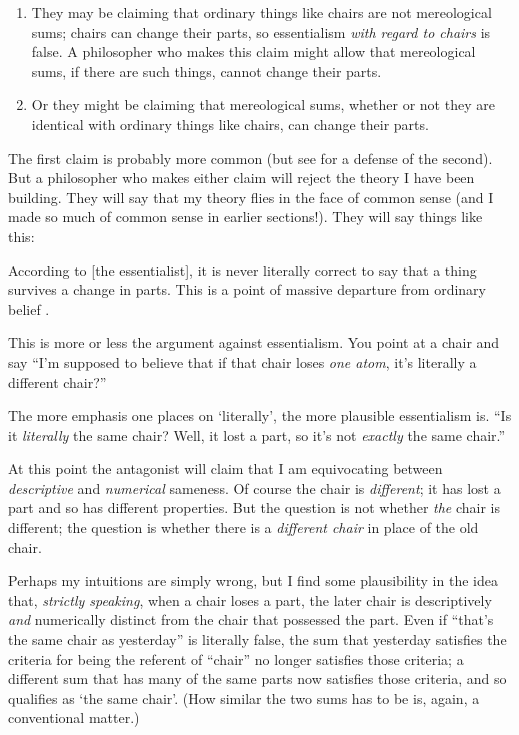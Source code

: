 \documentclass[11pt]{article}
\newenvironment{squote}{%
\begin{spacing}{1}
\begin{list}{}{%
\setlength{\labelwidth}{0pt}%
\rightmargin\leftmargin%
}
\item\relax
}{%
\end{list}%
\end{spacing}
}
\begin{document}
\begin{spacing}{1.5}
\begin{enumerate}
  \item They may be claiming that ordinary things like chairs are not
    mereological sums; chairs can change their parts, so essentialism
    {\em with regard to chairs} is false.  A philosopher who makes
    this claim might allow that mereological sums, if there are such
    things, cannot change their parts.
  \item Or they might be claiming that mereological sums, whether or
    not they are identical with ordinary things like chairs, can
    change their parts.
\end{enumerate}

The first claim is probably more common (but see \citet{inwagen2006}
for a defense of the second).  But a philosopher who makes either
claim will reject the theory I have been building.  They will say that
my theory flies in the face of common sense (and I made so much of
common sense in earlier sections!).  They will say things like this:

\begin{squote}
According to [the essentialist], it is never literally correct to say
that a thing survives a change in parts.  This is a point of massive
departure from ordinary belief \citep[184]{sider2001}.
\end{squote}

This is more or less the argument against essentialism.  You point at
a chair and say ``I'm supposed to believe that if that chair loses
{\em one atom}, it's literally a different chair?''

The more emphasis one places on `literally', the more plausible
essentialism is.  ``Is it {\em literally} the same chair?  Well, it
lost a part, so it's not {\em exactly} the same chair.''

At this point the antagonist will claim that I am equivocating between
{\em descriptive} and {\em numerical} sameness.  Of course the chair
is {\em different}; it has lost a part and so has different
properties.  But the question is not whether {\em the} chair is
different; the question is whether there is a {\em different chair} in
place of the old chair.

Perhaps my intuitions are simply wrong, but I find some plausibility
in the idea that, {\em strictly speaking}, when a chair loses a part,
the later chair is descriptively {\em and} numerically distinct from
the chair that possessed the part.  Even if ``that's the same chair as
yesterday'' is literally false, the sum that yesterday satisfies the
criteria for being the referent of ``chair'' no longer satisfies those
criteria; a different sum that has many of the same parts now
satisfies those criteria, and so qualifies as `the same chair'.  (How
similar the two sums has to be is, again, a conventional matter.)


\end{spacing}
\end{document}
